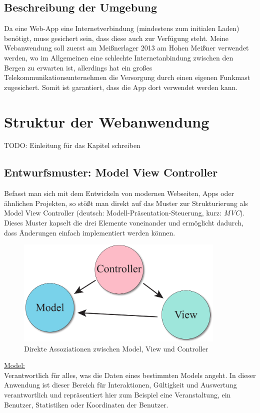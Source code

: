 \subsection{Beschreibung der Umgebung}
Da eine Web-App eine Internetverbindung (mindestens zum initialen Laden) benötigt, muss gesichert sein, dass diese auch zur Verfügung steht. Meine Webanwendung soll zuerst am Meißnerlager 2013 am Hohen Meißner verwendet werden, wo im Allgemeinen eine schlechte Internetanbindung zwischen den Bergen zu erwarten ist, allerdings hat ein großes Telekommunikationsunternehmen die Versorgung durch einen eigenen Funkmast zugesichert. Somit ist garantiert, dass die App dort verwendet werden kann.

\section{Struktur der Webanwendung}
TODO: Einleitung für das Kapitel schreiben

\subsection{Entwurfsmuster: Model View Controller}

Befasst man sich mit dem Entwickeln von modernen Webseiten, Apps oder ähnlichen Projekten, so stößt man direkt auf das Muster zur Strukturierung als Model View Controller (deutsch: Modell-Präsentation-Steuerung, kurz: \emph{MVC}). Dieses Muster kapselt die drei Elemente voneinander und ermöglicht dadurch, dass Änderungen einfach implementiert werden können.

\begin{figure}[!ht]
	\centering
	\includegraphics[width=10cm]{fig/mvc}
	\caption{Direkte Assoziationen zwischen Model, View und Controller}
\end{figure}

\underline{Model:}\\
Verantwortlich für alles, was die Daten eines bestimmten Models angeht. In dieser Anwendung ist dieser Bereich für Interaktionen, Gültigkeit und Auswertung verantwortlich und repräsentiert hier zum Beispiel eine Veranstaltung, ein Benutzer, Statistiken oder Koordinaten der Benutzer.

